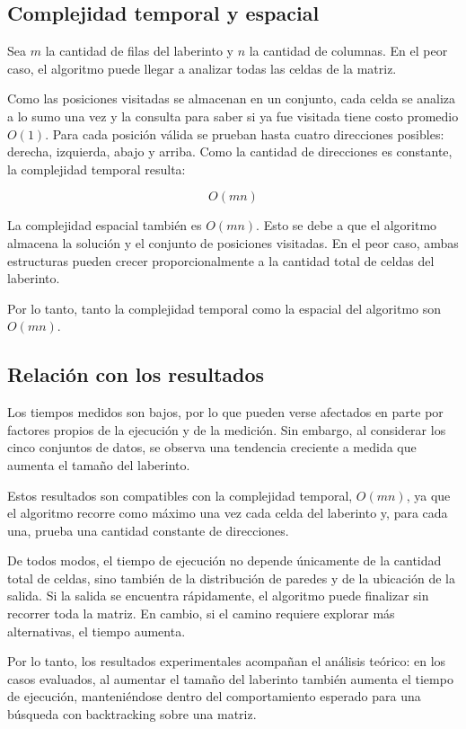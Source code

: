 \subsection{Complejidad temporal y espacial}

Sea $m$ la cantidad de filas del laberinto y $n$ la cantidad de columnas. En el peor caso, el algoritmo puede llegar a analizar todas las celdas de la matriz.

Como las posiciones visitadas se almacenan en un conjunto, cada celda se analiza a lo sumo una vez y la consulta para saber si ya fue visitada tiene costo promedio $O(1)$. Para cada posición válida se prueban hasta cuatro direcciones posibles: derecha, izquierda, abajo y arriba. Como la cantidad de direcciones es constante, la complejidad temporal resulta:

\[
O(mn)
\]

La complejidad espacial también es $O(mn)$. Esto se debe a que el algoritmo almacena la solución y el conjunto de posiciones visitadas. En el peor caso, ambas estructuras pueden crecer proporcionalmente a la cantidad total de celdas del laberinto.

Por lo tanto, tanto la complejidad temporal como la espacial del algoritmo son $O(mn)$.

\subsection{Relación con los resultados}

Los tiempos medidos son bajos, por lo que pueden verse afectados en parte por factores propios de la ejecución y de la medición. Sin embargo, al considerar los cinco conjuntos de datos, se observa una tendencia creciente a medida que aumenta el tamaño del laberinto.

Estos resultados son compatibles con la complejidad temporal, $O(mn)$, ya que el algoritmo recorre como máximo una vez cada celda del laberinto y, para cada una, prueba una cantidad constante de direcciones.

De todos modos, el tiempo de ejecución no depende únicamente de la cantidad total de celdas, sino también de la distribución de paredes y de la ubicación de la salida. Si la salida se encuentra rápidamente, el algoritmo puede finalizar sin recorrer toda la matriz. En cambio, si el camino requiere explorar más alternativas, el tiempo aumenta.

Por lo tanto, los resultados experimentales acompañan el análisis teórico: en los casos evaluados, al aumentar el tamaño del laberinto también aumenta el tiempo de ejecución, manteniéndose dentro del comportamiento esperado para una búsqueda con backtracking sobre una matriz.
